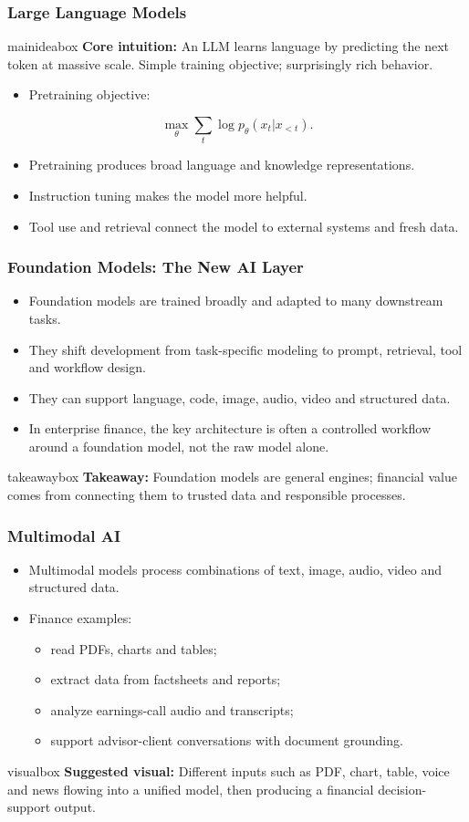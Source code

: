 \documentclass[aspectratio=169,12pt]{beamer}
\newcommand{\currentframetitle}{}
\newcommand{\slideTitle}[1]{\gdef\currentframetitle{#1}\frametitle{#1}}
\newcommand{\mainidea}[1]{%
  \vspace{0.08cm}
  \begin{beamercolorbox}[wd=\linewidth,rounded=true,sep=0.18cm]{mainideabox}
    \small\textbf{Core intuition:} #1
  \end{beamercolorbox}%
}
\newcommand{\takeaway}[1]{%
  \vspace{0.08cm}
  \begin{beamercolorbox}[wd=\linewidth,rounded=true,sep=0.18cm]{takeawaybox}
    \small\textbf{Takeaway:} #1
  \end{beamercolorbox}%
}
\newcommand{\visual}[1]{%
  \vspace{0.12cm}
  \begin{beamercolorbox}[wd=\linewidth,rounded=true,sep=0.16cm]{visualbox}
    \scriptsize\textbf{Suggested visual:} #1
  \end{beamercolorbox}%
}
\begin{document}
\begin{frame}
\slideTitle{Large Language Models}
\mainidea{An LLM learns language by predicting the next token at massive scale. Simple training objective; surprisingly rich behavior.}
\begin{itemize}
  \item Pretraining objective:
\end{itemize}
\[
\max_\theta \sum_t \log p_\theta(x_t|x_{<t}).
\]
\begin{itemize}
  \item Pretraining produces broad language and knowledge representations.
  \item Instruction tuning makes the model more helpful.
  \item Tool use and retrieval connect the model to external systems and fresh data.
\end{itemize}
\end{frame}




\begin{frame}
\slideTitle{Foundation Models: The New AI Layer}
\begin{itemize}
  \item Foundation models are trained broadly and adapted to many downstream tasks.
  \item They shift development from task-specific modeling to prompt, retrieval, tool and workflow design.
  \item They can support language, code, image, audio, video and structured data.
  \item In enterprise finance, the key architecture is often a controlled workflow around a foundation model, not the raw model alone.
\end{itemize}
\takeaway{Foundation models are general engines; financial value comes from connecting them to trusted data and responsible processes.}
\end{frame}

\begin{frame}
\slideTitle{Multimodal AI}
\begin{itemize}
  \item Multimodal models process combinations of text, image, audio, video and structured data.
  \item Finance examples:
  \begin{itemize}
    \item read PDFs, charts and tables;
    \item extract data from factsheets and reports;
    \item analyze earnings-call audio and transcripts;
    \item support advisor-client conversations with document grounding.
  \end{itemize}
\end{itemize}
\visual{Different inputs such as PDF, chart, table, voice and news flowing into a unified model, then producing a financial decision-support output.}
\end{frame}
\end{document}
